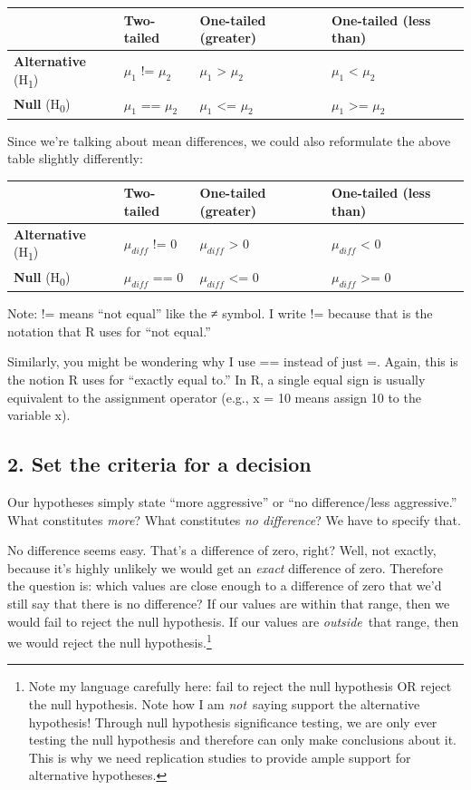 \documentclass[
]{book}
\begin{document}
\begin{longtable}[]{@{}llll@{}}
\toprule
& Two-tailed & One-tailed (greater) & One-tailed (less than) \\
\midrule
\endhead
\textbf{Alternative} (H\textsubscript{1}) & \(\mu_1\) != \(\mu_2\) & \(\mu_1\) \textgreater{} \(\mu_2\) & \(\mu_1\) \textless{} \(\mu_2\) \\
\textbf{Null} (H\textsubscript{0}) & \(\mu_1\) == \(\mu_2\) & \(\mu_1\) \textless= \(\mu_2\) & \(\mu_1\) \textgreater= \(\mu_2\) \\
\bottomrule
\end{longtable}

Since we're talking about mean differences, we could also reformulate the above table slightly differently:

\begin{longtable}[]{@{}llll@{}}
\toprule
& Two-tailed & One-tailed (greater) & One-tailed (less than) \\
\midrule
\endhead
\textbf{Alternative} (H\textsubscript{1}) & \(\mu_{diff}\) != 0 & \(\mu_{diff}\) \textgreater{} 0 & \(\mu_{diff}\) \textless{} 0 \\
\textbf{Null} (H\textsubscript{0}) & \(\mu_{diff}\) == 0 & \(\mu_{diff}\) \textless= 0 & \(\mu_{diff}\) \textgreater= 0 \\
\bottomrule
\end{longtable}

Note: != means ``not equal'' like the ≠ symbol. I write != because that is the notation that R uses for ``not equal.''

Similarly, you might be wondering why I use == instead of just =. Again, this is the notion R uses for ``exactly equal to.'' In R, a single equal sign is usually equivalent to the assignment operator (e.g., x = 10 means assign 10 to the variable x).

\hypertarget{set-the-criteria-for-a-decision}{%
\subsection{2. Set the criteria for a decision}\label{set-the-criteria-for-a-decision}}

Our hypotheses simply state ``more aggressive'' or ``no difference/less aggressive.'' What constitutes \emph{more}? What constitutes \emph{no difference}? We have to specify that.

No difference seems easy. That's a difference of zero, right? Well, not exactly, because it's highly unlikely we would get an \emph{exact} difference of zero. Therefore the question is: which values are close enough to a difference of zero that we'd still say that there is no difference? If our values are within that range, then we would fail to reject the null hypothesis. If our values are \emph{outside}~that range, then we would reject the null hypothesis.\footnote{Note my language carefully here: fail to reject the null hypothesis OR reject the null hypothesis. Note how I am \emph{not}~saying support the alternative hypothesis! Through null hypothesis significance testing, we are only ever testing the null hypothesis and therefore can only make conclusions about it. This is why we need replication studies to provide ample support for alternative hypotheses.}
\end{document}
